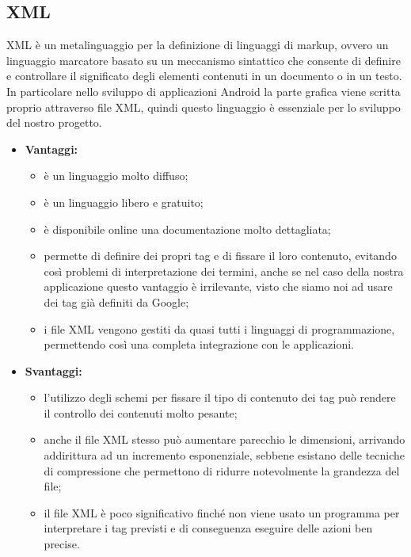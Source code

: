 \subsection{XML}
	
	XML è un metalinguaggio per la definizione di linguaggi di markup, ovvero un linguaggio marcatore basato su un meccanismo sintattico che consente di definire e controllare il significato degli elementi contenuti in un documento o in un testo.
	In particolare nello sviluppo di applicazioni Android la parte grafica viene scritta proprio attraverso file XML, quindi questo linguaggio è essenziale per lo sviluppo del nostro progetto.
	
	\begin{itemize}
		\item \textbf{Vantaggi:}
			\begin{itemize}
				\item è un linguaggio molto diffuso;
				\item è un linguaggio libero e gratuito;
				\item è disponibile online una documentazione molto dettagliata;
				\item permette di definire dei propri tag e di fissare il loro contenuto, evitando così problemi di interpretazione dei termini, anche se nel caso della nostra applicazione questo vantaggio è irrilevante, visto che siamo noi ad usare dei tag già definiti da Google;
				\item i file XML vengono gestiti da quasi tutti i linguaggi di programmazione, permettendo così una completa integrazione con le applicazioni.
			\end{itemize}
		\item \textbf{Svantaggi:}
			\begin{itemize}
				\item l'utilizzo degli schemi per fissare il tipo di contenuto dei tag può rendere il controllo dei contenuti molto pesante;
				\item anche il file XML stesso può aumentare parecchio le dimensioni, arrivando addirittura ad un incremento esponenziale, sebbene esistano delle tecniche di compressione che permettono di ridurre notevolmente la grandezza del file;
				\item il file XML è poco significativo finché non viene usato un programma per interpretare i tag previsti e di conseguenza eseguire delle azioni ben precise.
			\end{itemize}
	\end{itemize}
	

